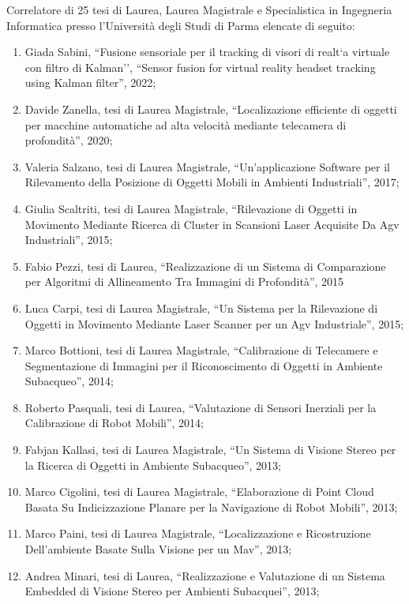 \documentclass[11pt]{article}
\begin{document}
%
\vspace{3mm}
%
Correlatore di 25 tesi di Laurea, Laurea Magistrale e Specialistica in Ingegneria Informatica presso l'Universit\`a degli Studi di Parma elencate di seguito: 
\begin{enumerate}
\item Giada Sabini, ``Fusione sensoriale per il tracking di visori di realt`a virtuale con filtro di Kalman'', 
  ``Sensor fusion for virtual reality headset tracking using Kalman filter'', 2022; 
%
\item Davide Zanella, tesi di Laurea Magistrale, ``Localizazione efficiente di oggetti per macchine automatiche ad alta velocit\`a mediante telecamera di profondit\`a'', 2020;
\item Valeria Salzano, tesi di Laurea Magistrale, ``Un'applicazione Software per il Rilevamento della Posizione di Oggetti Mobili  in Ambienti Industriali'', 2017;
%
\item Giulia Scaltriti, tesi di Laurea Magistrale, ``Rilevazione di Oggetti  in Movimento Mediante Ricerca di Cluster  in Scansioni Laser Acquisite Da Agv Industriali'', 2015;
\item Fabio Pezzi, tesi di Laurea, ``Realizzazione di un Sistema di Comparazione per Algoritmi di Allineamento Tra Immagini di Profondit\`a'', 2015
\item Luca Carpi, tesi di Laurea Magistrale, ``Un Sistema per la Rilevazione di Oggetti in Movimento Mediante Laser Scanner per un Agv Industriale'', 2015;
%
\item Marco Bottioni, tesi di Laurea Magistrale, ``Calibrazione di Telecamere e Segmentazione di Immagini per il Riconoscimento di Oggetti in Ambiente Subacqueo'', 2014;
\item Roberto Pasquali, tesi di Laurea, ``Valutazione di Sensori Inerziali per la Calibrazione di Robot Mobili'', 2014;
%
\item Fabjan Kallasi,  tesi di Laurea Magistrale, ``Un Sistema di Visione Stereo per la Ricerca di Oggetti in Ambiente Subacqueo'', 2013;
\item Marco Cigolini, tesi di Laurea Magistrale, ``Elaborazione di Point Cloud Basata Su Indicizzazione Planare per la Navigazione di Robot Mobili'', 2013;
\item Marco Paini, tesi di Laurea Magistrale, ``Localizzazione e Ricostruzione Dell'ambiente Basate Sulla Visione per un Mav'', 2013;
\item Andrea Minari, tesi di Laurea, ``Realizzazione e Valutazione di un Sistema Embedded di Visione Stereo per Ambienti Subacquei'', 2013;

\end{enumerate}
\end{document}
